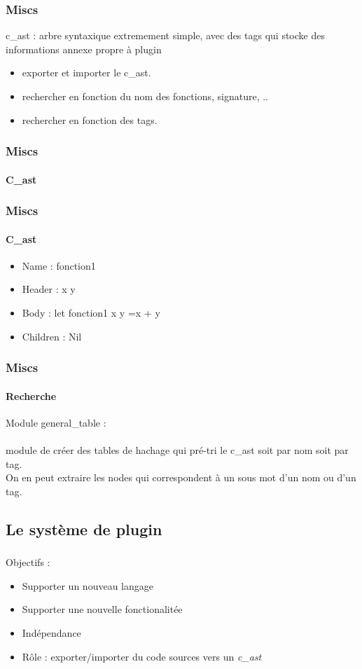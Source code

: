 \documentclass{beamer}
\begin{document}
\begin{frame}
    \frametitle{Miscs}

    c\_ast : arbre syntaxique extremement simple, avec des tags qui stocke des informations annexe propre à plugin
    \begin{itemize}
        \item exporter et importer le c\_ast.
        \item rechercher en fonction du nom des fonctions, signature, ..
        \item rechercher en fonction des tags.
    \end{itemize}
\end{frame}

\begin{frame}
    \frametitle{Miscs}
    \framesubtitle{C\_ast}

    
\end{frame}

\begin{frame}
    \frametitle{Miscs}
    \framesubtitle{C\_ast}

    
    \begin{itemize}
        \item Name : fonction1
        \item Header : x y
        \item Body : let fonction1 x y =x + y
        \item Children : Nil
    \end{itemize}
\end{frame}

\begin{frame}
    \frametitle{Miscs}
    \framesubtitle{Recherche}

    Module general\_table :\\ \ \\
    module de créer des tables de hachage qui pré-tri le c\_ast 
    soit par nom soit par tag.\\
    On en peut extraire les nodes qui correspondent à un sous mot 
    d'un nom ou d'un tag.
\end{frame}


\begin{frame}
\section{Le système de plugin}
\frametitle{}
 
 Objectifs :
\begin{itemize}
    \item Supporter un nouveau langage
    \item Supporter une nouvelle fonctionalitée 
    \item Indépendance %
    \item Rôle : exporter/importer du code sources vers un \textit{c\_ast}
\end{itemize}

\end{frame}
\end{document}

